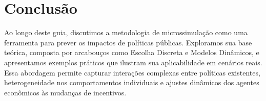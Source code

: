 \documentclass[12pt]{article}
\theoremstyle{break}
\begin{document}


\section{Conclusão}

Ao longo deste guia, discutimos a metodologia de microssimulação como uma ferramenta para prever os impactos de políticas públicas. Exploramos sua base teórica, composta por arcabouços como Escolha Discreta e Modelos Dinâmicos, e apresentamos exemplos práticos que ilustram sua aplicabilidade em cenários reais. Essa abordagem permite capturar interações complexas entre políticas existentes, heterogeneidade nos comportamentos individuais e ajustes dinâmicos dos agentes econômicos às mudanças de incentivos.
\end{document}
